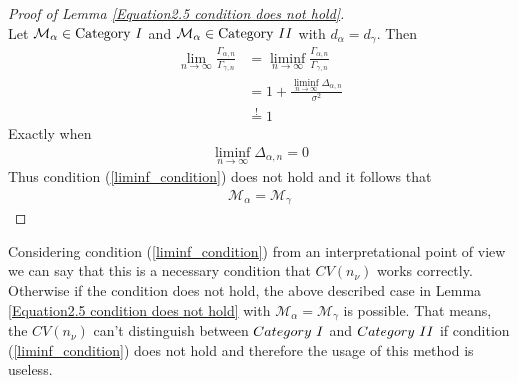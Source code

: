 \documentclass[Research_Module_ES.tex]{subfiles}
\begin{document}
\begin{proof}[Proof of Lemma \ref{Equation2.5 condition does not hold}]~\\
	Let $\mathcal{M}_\alpha\in\text{Category}~\RM{1}$ and $\mathcal{M}_\alpha\in\text{Category}~\RM{2}$ with $d_\alpha=d_\gamma$. Then 
	\begin{align*}
		\lim_{n\rightarrow\infty}\frac{\Gamma_{\alpha,n}}{\Gamma_{\gamma,n}}&=\liminf_{n\rightarrow\infty}\frac{\Gamma_{\alpha,n}}{\Gamma_{\gamma,n}}\\
		&=1+\frac{\liminf_{n\rightarrow\infty}\Delta_{\alpha,n}}{\sigma^2}\\
		&\stackrel{!}{=}1
	\end{align*}
	Exactly when
	\begin{align*}
		\liminf_{n\rightarrow\infty}\Delta_{\alpha,n}=0
	\end{align*}
	Thus condition (\ref{liminf_condition}) does not hold and it follows that
	\begin{align*}
		\mathcal{M}_\alpha=\mathcal{M}_\gamma
	\end{align*}
\end{proof}

Considering condition (\ref{liminf_condition}) from an interpretational point of view we can say that
this is a necessary condition that $CV(n_\nu)$ works correctly. Otherwise if the condition does not hold, the above described case in Lemma \ref{Equation2.5 condition does not hold} with $\mathcal{M}_\alpha=\mathcal{M}_\gamma$ is possible. That means, the $CV(n_\nu)$ can't distinguish between $Category~\RM{1}$ and $Category~\RM{2}$ if condition (\ref{liminf_condition}) does not hold and therefore the usage of this method is useless.
\end{document}
